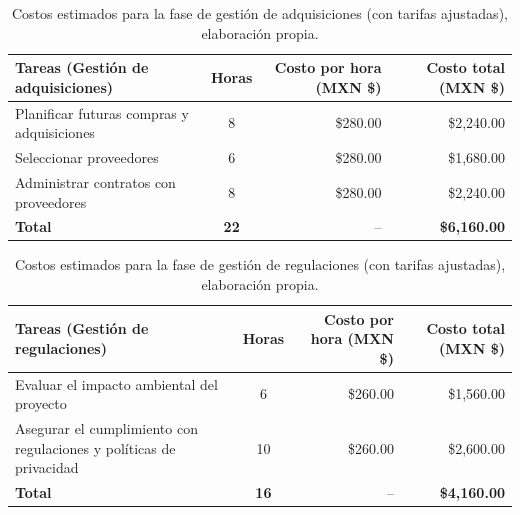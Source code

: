 \begin{table}[H]
	\centering
	\renewcommand{\arraystretch}{1.6}
	\setlength{\tabcolsep}{10pt}
	\Huge
	\begin{adjustbox}{max width=\textwidth}
		\begin{tabular}{|p{9.5cm}|c|r|r|}
			\hline
			\textbf{Tareas (Gestión de adquisiciones)} & \textbf{Horas} & \textbf{Costo por hora (MXN \$)} & \textbf{Costo total (MXN \$)} \\ \hline
			Planificar futuras compras y adquisiciones & 8 & \$280.00 & \$2,240.00 \\ \hline
			Seleccionar proveedores & 6 & \$280.00 & \$1,680.00 \\ \hline
			Administrar contratos con proveedores & 8 & \$280.00 & \$2,240.00 \\ \hline
			\textbf{Total} & \textbf{22} & -- & \textbf{\$6,160.00} \\ \hline
		\end{tabular}
	\end{adjustbox}
	\caption[Costos estimados para la fase de gestión de adquisiciones (con tarifas ajustadas)]{Costos estimados para la fase de gestión de adquisiciones (con tarifas ajustadas), elaboración propia.} 
	\label{tab:costos_adquisiciones_actualizado}
\end{table}

\begin{table}[H]
	\centering
	\renewcommand{\arraystretch}{1.6}
	\setlength{\tabcolsep}{10pt}
	\Huge
	\begin{adjustbox}{max width=\textwidth}
		\begin{tabular}{|p{9.5cm}|c|r|r|}
			\hline
			\textbf{Tareas (Gestión de regulaciones)} & \textbf{Horas} & \textbf{Costo por hora (MXN \$)} & \textbf{Costo total (MXN \$)} \\ \hline
			Evaluar el impacto ambiental del proyecto & 6 & \$260.00 & \$1,560.00 \\ \hline
			Asegurar el cumplimiento con regulaciones y políticas de privacidad & 10 & \$260.00 & \$2,600.00 \\ \hline
			\textbf{Total} & \textbf{16} & -- & \textbf{\$4,160.00} \\ \hline
		\end{tabular}
	\end{adjustbox}
	\caption[Costos estimados para la fase de gestión de regulaciones (con tarifas ajustadas)]{Costos estimados para la fase de gestión de regulaciones (con tarifas ajustadas), elaboración propia.} 
	\label{tab:costos_regulaciones_actualizado}
\end{table}


